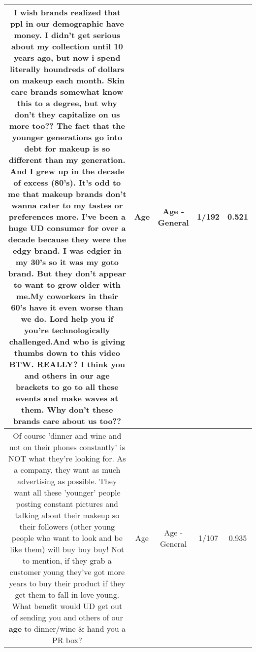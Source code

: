\documentclass[11pt]{article}
\newlength\mylength
\begin{document}
\begin{center}
\begin{longtable}{|C{.65\mylength}|C{.30\mylength}|C{.12\mylength}|C{.12\mylength}|C{.12\mylength}|}
  \small I wish brands realized that ppl in our demographic have money.  I didn't get serious about my collection until 10 years ago, but now i spend literally houndreds of dollars on makeup each month. Skin care brands somewhat know this to a degree, but why don't they capitalize on us more too?? The fact that the younger generations go into debt for makeup is so different than my generation. And I grew up in the decade of excess (80's). It's odd to me that makeup brands don't wanna cater to my tastes or preferences more. I've been a huge UD consumer for over a decade because they were the edgy brand. I was edgier in my 30's so it was my goto brand. But they don't appear to want to grow older with me.My coworkers in their 60's have it even worse than we do. Lord help you if you're technologically challenged.And who is giving thumbs down to this video BTW. REALLY?  I think you and others in our \textbf{age} brackets to go to all these events and make waves at them. Why don't these brands care about us too??\normalsize   & Age & Age - General & 1/192 & 0.521 \\  \hline
  \small Of course 'dinner and wine and not on their phones constantly' is NOT what they're looking for.  As a company, they want as much advertising as possible.  They want all these 'younger' people posting constant pictures and talking about their makeup so their followers (other young people who want to look and be like them) will buy buy buy!  Not to mention, if they grab a customer young they've got more years to buy their product if they get them to fall in love young.  What benefit would UD get out of sending you and others of our \textbf{age} to dinner/wine \& hand you a PR box?\normalsize   & Age & Age - General & 1/107 & 0.935 \\  \hline

\end{longtable}
\end{center}
\end{document}
